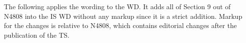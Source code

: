 \def\rSec#1[#2]#3{%
  \ifcase#1\let\s=\wgSubsection
  \or\let\s=\wgSubsubsection
  \or\let\s=\wgSubsubsubsection
  \or\let\s=\error
  \fi%
  \s{#3}{#2}\label{#2}}

\newcommand\flagsRequires[2]{
\item If the template parameter \tcode{Flags} is \tcode{vector_aligned_tag}, \tcode{mem} shall point to storage aligned by \tcode{memory_alignment_v<#1>}.
\item If the template parameter \tcode{Flags} is \tcode{overaligned_tag<N>}, \tcode{mem} shall point to storage aligned by \tcode{N}.
\item If the template parameter \tcode{Flags} is \tcode{element_aligned_tag}, \tcode{mem} shall point to storage aligned by \tcode{alignof(#2)}.
}

The following applies the wording to the WD.
It adds all of Section 9 out of N4808 into the IS WD without any markup since it is a strict addition.
Markup for the changes is relative to N4808, which contains editorial changes after the publication of the TS.

